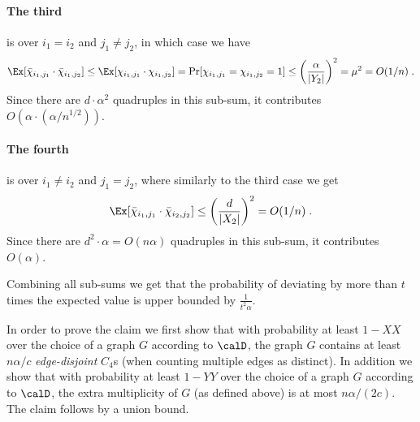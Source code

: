 \paragraph{The third} is over $i_1 = i_2$ and $j_1 \neq j_2$, in which case we have
\begin{equation}\label{eq:cheb-case2}
\Ex[\bar{\chi}_{i_1,j_1}\cdot \bar{\chi}_{i_1,j_2}]
\leq \Ex[\chi_{i_1,j_1}\cdot \chi_{i_1,j_2}] = \Pr[\chi_{i_1,j_1}=\chi_{i_1,j_2}=1]
  \leq \left( \frac{\alpha}{|Y_2|}\right)^2 = \mu^2 = O(1/n)\;.
\end{equation}
Since there are $d\cdot \alpha^2$ quadruples in this sub-sum, it contributes $O(\alpha \cdot (\alpha/n^{1/2}))$.

\paragraph{The fourth} is over $i_1 \neq i_2$ and $j_1 = j_2$, where similarly to the third case we get
\begin{equation}\label{eq:cheb-case3}
\Ex[\bar{\chi}_{i_1,j_1}\cdot \bar{\chi}_{i_2,j_2}]  %
\leq %
\left( \frac{d}{|X_2|}\right)^2 = O(1/n)\;.
\end{equation}
Since there are $d^2\cdot \alpha = O(n\alpha)$ quadruples in this sub-sum, it contributes $O(\alpha)$.

Combining all sub-sums we get that the probability of deviating by more than $t$ times the expected value is upper bounded by $\frac{1}{t^2 \alpha}$.
\fi






%
\iffalse
In order to prove the claim we first show that with probability at least $1-XX$ over the choice of a graph $G$ according to $\calD$, the graph $G$ contains at least $n\alpha/c$ \emph{edge-disjoint} $C_4$s (when counting multiple edges as distinct).
In addition we show that with probability at least $1-YY$ over the choice of a graph $G$ according to $\calD$,
the extra multiplicity of $G$ (as defined above) is at most $n\alpha/(2c)$.
The claim follows by a union bound.

